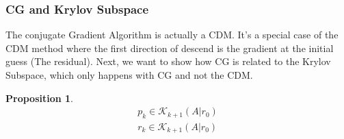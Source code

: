\documentclass[]{article}
\theoremstyle{definition}
\newtheorem{prop}{Proposition}[section]  %
\begin{document}
        \subsubsection{CG and Krylov Subspace}\label{sec:CG_and_Krylov_Subspace}
            The conjugate Gradient Algorithm is actually a CDM. It's a special case of the CDM method where the first direction of descend is the gradient at the initial guess (The residual). Next, we want to show how CG is related to the Krylov Subspace, which only happens with CG and not the CDM. 
            \begin{prop}
                \begin{align}
                    p_k \in \mathcal K_{k + 1}(A|r_0)
                    \\
                    r_k \in \mathcal K_{k + 1}(A|r_0)
                \end{align}    
            \end{prop}
\end{document}
